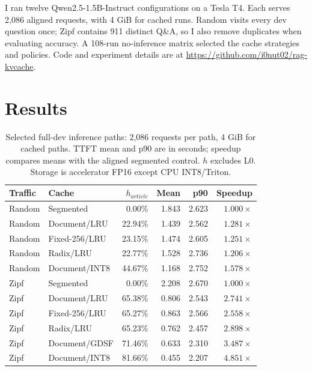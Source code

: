 \documentclass{article}
\begin{document}
I ran twelve Qwen2.5-1.5B-Instruct configurations on a Tesla T4. Each serves
2,086 aligned requests, with 4 GiB for cached runs. Random visits every dev
question once; Zipf contains 911 distinct Q\&A, so I also remove duplicates
when evaluating accuracy. A 108-run no-inference matrix selected the cache
strategies and policies. Code and experiment details are at
\url{https://github.com/i0nut02/rag-kvcache}.

\section{Results}

\begin{table}[t]
\caption{Selected full-dev inference paths: 2,086 requests per path, 4 GiB for cached paths.
TTFT mean and p90 are in seconds; speedup compares means with the aligned
segmented control. $h$ excludes L0. Storage is accelerator FP16 except CPU
INT8/Triton.}
\label{tab:main}
\centering
\begin{footnotesize}
\setlength{\tabcolsep}{3pt}
\begin{tabular}{llrrrr}
\toprule
Traffic & Cache & $h_{article}$ & Mean & p90 & Speedup \\
\midrule
Random & Segmented & 0.00\% & 1.843 & 2.623 & $1.000\times$ \\
Random & Document/LRU & 22.94\% & 1.439 & 2.562 & $1.281\times$ \\
Random & Fixed-256/LRU & 23.15\% & 1.474 & 2.605 & $1.251\times$ \\
Random & Radix/LRU & 22.77\% & 1.528 & 2.736 & $1.206\times$ \\
Random & Document/INT8 & 44.67\% & 1.168 & 2.752 & $1.578\times$ \\
\midrule
Zipf & Segmented & 0.00\% & 2.208 & 2.670 & $1.000\times$ \\
Zipf & Document/LRU & 65.38\% & 0.806 & 2.543 & $2.741\times$ \\
Zipf & Fixed-256/LRU & 65.27\% & 0.863 & 2.566 & $2.558\times$ \\
Zipf & Radix/LRU & 65.23\% & 0.762 & 2.457 & $2.898\times$ \\
Zipf & Document/GDSF & 71.46\% & 0.633 & 2.310 & $3.487\times$ \\
Zipf & Document/INT8 & 81.66\% & 0.455 & 2.207 & $4.851\times$ \\
\bottomrule
\end{tabular}
\end{footnotesize}
\end{table}
\end{document}
